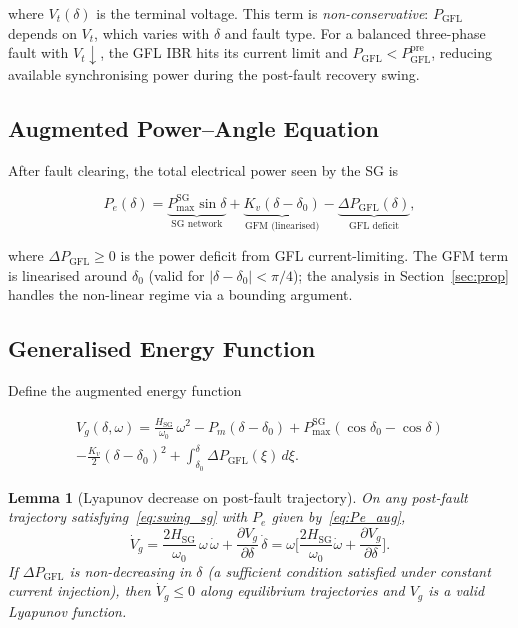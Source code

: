 \documentclass[11pt,a4paper]{article}
\newtheorem{lemma}{Lemma}
\newcommand{\dz}{\delta_0}         %
\newcommand{\Pm}{P_m}
\newcommand{\PmaxSG}{P_{\max}^{\mathrm{SG}}}
\newcommand{\Kv}{K_v}
\newcommand{\Hsg}{H_{\mathrm{SG}}}
\newcommand{\omegaz}{\omega_0}
\begin{document}
where $V_t(\delta)$ is the terminal voltage.  This term is
\emph{non-conservative}: $P_{\mathrm{GFL}}$ depends on $V_t$, which varies
with $\delta$ and fault type.  For a balanced three-phase fault with
$V_t\!\downarrow$, the GFL IBR hits its current limit and
$P_{\mathrm{GFL}} < P_{\mathrm{GFL}}^{\mathrm{pre}}$, reducing available
synchronising power during the post-fault recovery swing.

\subsection{Augmented Power--Angle Equation}
\label{sec:pae}

After fault clearing, the total electrical power seen by the SG is

\begin{equation}
  P_e(\delta) = \underbrace{\PmaxSG\sin\delta}_{\text{SG network}}
    + \underbrace{\Kv(\delta - \dz)}_{\text{GFM (linearised)}}
    - \underbrace{\Delta P_{\mathrm{GFL}}(\delta)}_{\text{GFL deficit}},
  \label{eq:Pe_aug}
\end{equation}

where $\Delta P_{\mathrm{GFL}} \geq 0$ is the power deficit from GFL
current-limiting.  The GFM term is linearised around $\dz$ (valid for
$|\delta - \dz| < \pi/4$); the analysis in
Section~\ref{sec:prop} handles the non-linear regime via a bounding argument.

\subsection{Generalised Energy Function}
\label{sec:lyap}

Define the augmented energy function

\begin{multline}
  V_g(\delta,\omega) = \frac{\Hsg}{\omegaz}\,\omega^2
    - \Pm(\delta - \dz)
    + \PmaxSG(\cos\dz - \cos\delta) \\
    - \frac{\Kv}{2}(\delta - \dz)^2
    + \int_{\dz}^{\delta}\Delta P_{\mathrm{GFL}}(\xi)\,d\xi.
  \label{eq:lyap_gen}
\end{multline}

\begin{lemma}[Lyapunov decrease on post-fault trajectory]
\label{lem:lyap}
On any post-fault trajectory satisfying~\eqref{eq:swing_sg}
with $P_e$ given by~\eqref{eq:Pe_aug},
\begin{equation}
  \dot{V}_g = \frac{2\Hsg}{\omegaz}\,\omega\,\dot{\omega}
    + \frac{\partial V_g}{\partial\delta}\,\dot{\delta}
  = \omega\bigl[\textstyle\frac{2\Hsg}{\omegaz}\dot{\omega}
                + \frac{\partial V_g}{\partial\delta}\bigr].
  \label{eq:Vdot}
\end{equation}
If $\Delta P_{\mathrm{GFL}}$ is non-decreasing in $\delta$
(a sufficient condition satisfied under constant current injection),
then $\dot{V}_g \leq 0$ along equilibrium trajectories and $V_g$ is
a valid Lyapunov function.
\end{lemma}
\end{document}
